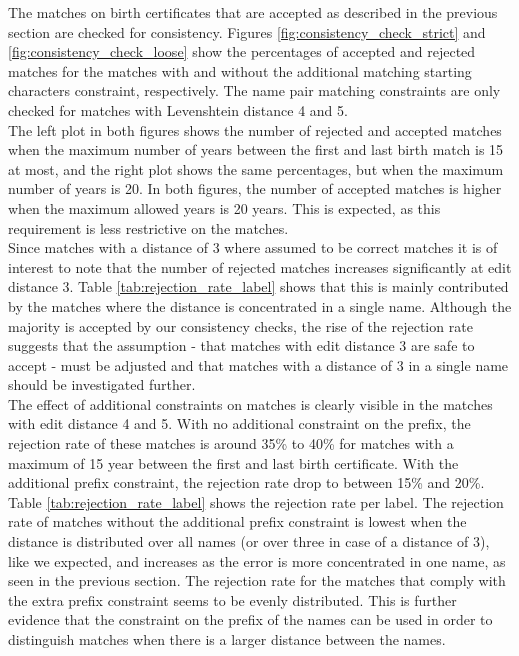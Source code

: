 The matches on birth certificates that are accepted as described in the previous section are checked for consistency. Figures \ref{fig:consistency_check_strict} and \ref{fig:consistency_check_loose} show the percentages of accepted and rejected matches for the matches with and without the additional matching starting characters constraint, respectively. The name pair matching constraints are only checked for matches with Levenshtein distance 4 and 5.\\
The left plot in both figures shows the number of rejected and accepted matches when the maximum number of years between the first and last birth match is 15 at most, and the right plot shows the same percentages, but when the maximum number of years is 20. In both figures, the number of accepted matches is higher when the maximum allowed years is 20 years. This is expected, as this requirement is less restrictive on the matches. \\

Since matches with a distance of 3 where assumed to be correct matches it is of interest to note that the number of rejected matches increases significantly at edit distance 3. Table \ref{tab:rejection_rate_label} shows that this is mainly contributed by the matches where the distance is concentrated in a single name. Although the majority is accepted by our consistency checks, the rise of the rejection rate suggests that the assumption - that matches with edit distance 3 are safe to accept - must be adjusted and that matches with a distance of 3 in a single name should be investigated further. \\
The effect of additional constraints on matches is clearly visible in the matches with edit distance 4 and 5. With no additional constraint on the prefix, the rejection rate of these matches is around 35\% to 40\% for matches with a maximum of 15 year between the first and last birth certificate. With the additional prefix constraint, the rejection rate drop to between 15\% and 20\%. \\

Table \ref{tab:rejection_rate_label} shows the rejection rate per label. The rejection rate of matches without the additional prefix constraint is lowest when the distance is distributed over all names (or over three in case of a distance of 3), like we expected, and increases as the error is more concentrated in one name, as seen in the previous section. The rejection rate for the matches that comply with the extra prefix constraint seems to be evenly distributed. This is further evidence that the constraint on the prefix of the names can be used in order to distinguish matches when there is a larger distance between the names.


